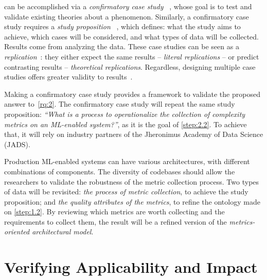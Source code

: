    can be accomplished via a \emph{confirmatory case study}%
  ~\parencite{Easterbrook2008SelectingEngineering}, whose goal is to 
  test and validate existing theories about a phenomenon. Similarly,
  a confirmatory case study requires a \emph{study proposition}%
  ~\parencite{Easterbrook2008SelectingEngineering}, which defines:
    what the study aims to achieve,
    which cases will be considered, and
    what types of data will be collected.
  Results come from analyzing the data. These case studies can be seen as a
  \emph{replication}~\parencite{Easterbrook2008SelectingEngineering}:
  they either expect the same results -- \emph{literal replications} --
  or predict contrasting results -- \emph{theoretical replications}.
  Regardless, designing multiple case studies offers greater validity
  to results~\parencite{Easterbrook2008SelectingEngineering}.

  Making a confirmatory case study provides a framework to validate the
  proposed answer to~\cref{rq:2}. The confirmatory case study will repeat
  the same study proposition: \emph{``What is a process to operationalize
  the collection of complexity metrics on an ML-enabled system?''}, as it
  is the goal of \cref{step:2.2}. To achieve that, it will rely on
  industry partners of the Jheronimus Academy of Data Science (JADS).

  Production ML-enabled systems can have various architectures, with
  different combinations of components. The diversity of codebases
  should allow the researchers to validate the robustness of the
  metric collection process. Two types of data will be revisited:
    \emph{the process of metric collection},
    to achieve the study proposition; and
    \emph{the quality attributes of the metrics},
    to refine the ontology made on \cref{step:1.2}.
  By reviewing which metrics are worth collecting and the requirements
  to collect them, the result will be a refined version of the
  \emph{metrics-oriented architectural model}.

  
  
  \section{Verifying Applicability and Impact}
  \label{sec:methodology_phase_2}
  \MethodologyPhase

